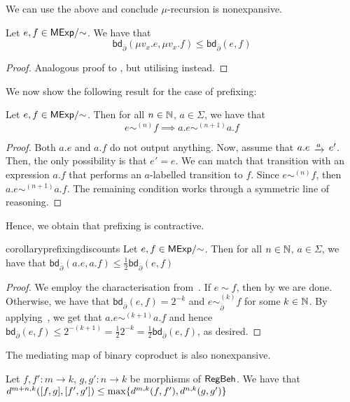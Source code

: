 We can use the above and conclude $\mu$-recursion is nonexpansive.
\begin{corollary}\label{cor:rec_nexp}
	Let $e,f \in {\mathsf{MExp}}/{\sim}$. We have that
	$$
		\mathsf{bd}_{\overline\partial} (\mu v_x.e,\mu v_x.f)\leq \mathsf{bd}_{\overline\partial} (e,f)
	$$
\end{corollary}
\begin{proof}
	Analogous proof to , but utilising  instead.
\end{proof}
We now show the following result for the case of prefixing:
\begin{lemma}\label{lem:prefixing_step}
	Let $e,f \in {\mathsf{MExp}}/{\sim}$. Then for all $n \in \mathbb{N}$, $a \in \Sigma$, we have that
	$$
	e \sim^{(n)} f \implies a.e \sim^{(n+1)} a.f 
	$$
\end{lemma}
\begin{proof}
	Both $a.e$ and $a.f$ do not output anything. Now, assume that $a.e \tr{a} e'$. Then, the only possibility is that $e'=e$. We can match that transition with an expression $a.f$ that performs an $a$-labelled transition to $f$. Since $e \sim^{(n)} f$, then $a.e \sim^{(n+1)} a.f$. The remaining condition works through a symmetric line of reasoning. 
\end{proof}
Hence, we obtain that prefixing is contractive.
\begin{restatable}{corollary}{prefixingdiscounts}\label{cor:prefixing_discounts}
	Let $e,f \in {\mathsf{MExp}}/{\sim}$. Then for all $n \in \mathbb{N}$, $a \in \Sigma$, we have that
	$
		\mathsf{bd}_{\overline{\partial}}(a.e,a.f) \leq \frac{1}{2}\mathsf{bd}_{\overline{\partial}}(e,f)
	$
\end{restatable}
\begin{proof}
	We employ the characterisation from~. If $e \sim f$, then by  we are done. Otherwise, we have that $\mathsf{bd}_{\overline\partial}(e,f)=2^{-k}$ and $e \sim^{(k)}_{\overline\partial} f$ for some $k \in \mathbb{N}$. By applying~, we get that $a.e \sim^{(k+1)} a.f$ and hence $\mathsf{bd}_{\overline\partial}(e,f)\leq 2^{-(k+1)} = \frac{1}{2} 2^{-k} = \frac{1}{2}\mathsf{bd}_{\overline\partial}(e,f)$, as desired. 
\end{proof}
The mediating map of binary coproduct is also nonexpansive.
\begin{lemma}\label{lem:pairs_nonexpansive}
	Let $f,f' \colon m \to k$, $g,g' \colon n \to k$ be morphisms of $\mathsf{RegBeh}$. We have that $d^{m +n, k}([ f, g ], [ f', g' ]) \leq \max \{d^{m,k}(f,f'), d^{n,k}(g,g')\}$
\end{lemma}
